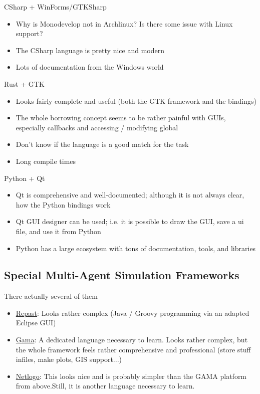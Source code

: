 CSharp + WinForms/GTKSharp
\begin{itemize}
	\item Why is Monodevelop not in Archlinux? Is there some issue with Linux support?
	\item The CSharp language is pretty nice and modern
	\item Lots of documentation from the Windows world
\end{itemize}

Rust + GTK
\begin{itemize}
	\item Looks fairly complete and useful (both the GTK framework and the bindings)
	\item The whole borrowing concept seems to be rather painful with GUIs, especially callbacks and accessing / modifying global 
	\item Don't know if the language is a good match for the task
	\item Long compile times
\end{itemize}


Python + Qt
\begin{itemize}
	\item Qt is comprehensive and well-documented; although it is not always clear, how the Python bindings work
	\item Qt GUI designer can be used; i.e. it is possible to draw the GUI, save a ui file, and use it from Python
	\item Python has a large ecosystem with tons of documentation, tools, and libraries
\end{itemize}

\subsection{Special Multi-Agent Simulation Frameworks}

There actually several of them
\begin{itemize}
    \item \href{https://repast.github.io/index.html}{Repast}: Looks rather complex (Java / Groovy programming via an adapted Eclipse GUI)
	\item \href{http://gama-platform.org}{Gama}: A dedicated language necessary to learn. Looks rather complex, but the whole framework feels rather comprehensive and professional (store stuff infiles, make plots, GIS support...)
	\item \href{http://ccl.northwestern.edu/netlogo}{Netlogo}: This looks nice and is probably simpler than the GAMA platform from above.Still, it is another language necessary to learn.
\end{itemize}



